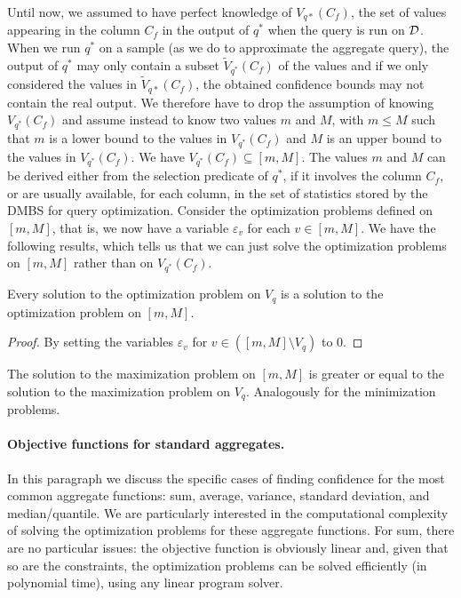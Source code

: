 Until now, we assumed to have perfect knowledge of $V_{q*}(C_f)$, the set of
values appearing in the column $C_f$ in the output of $q^*$ when the query is
run on ${\cal D}$. When we run $q^*$ on a sample (as we do to approximate the
aggregate query), the output of $q^*$ may only contain a subset
$\tilde{V}_{q^*}(C_f)$ of the values and if we only considered the values in
$\tilde{V}_{q*}(C_f)$, the obtained confidence bounds may not contain the real
output. We therefore have to drop the assumption of knowing $V_{q^*}(C_f)$ and
assume instead to know two values $m$ and $M$, with $m\le M$ such that $m$ is a
lower bound to the values in $V_{q^*}(C_f)$ and $M$ is an upper bound to the
values in $V_{q^*}(C_f)$. We have $V_{q^*}(C_f)\subseteq[m,M]$. The values $m$
and $M$ can be derived either from the selection predicate of $q^*$, if it
involves the column $C_f$, or are usually available, for each column, in the set
of statistics stored by the DMBS for query optimization. Consider the optimization
problems defined on $[m,M]$, that is, we now have a variable $\varepsilon_v$ for
each $v\in[m,M]$. 
We have the following results, which tells us that we can just solve
the optimization problems on $[m,M]$ rather than on $V_{q^*}(C_f)$. 

\begin{lemma}\label{lem:equivoptprobs}
  Every solution to the optimization problem on $V_q$ is a solution to the
  optimization problem on $[m,M]$.
\end{lemma}
\begin{proof}
  By setting the variables $\varepsilon_{v}$ for $v\in([m,M]\setminus V_q)$ to $0$.
\end{proof}

\begin{corollary}
  The solution to the maximization problem on $[m,M]$ is greater or equal to the
  solution to the maximization problem on $V_q$. Analogously for the
  minimization problems.
\end{corollary}

\paragraph{Objective functions for standard aggregates.}
In this paragraph we
discuss the specific cases of finding confidence for the most common aggregate
functions: sum, average, variance, standard deviation, and median/quantile. We
are particularly interested in the computational complexity of solving the
optimization problems for these aggregate functions.
For sum, there are no particular issues: the objective function is obviously
linear and, given that so are the constraints, the optimization problems can be
solved efficiently (in polynomial time), using any linear program
solver\citemissing.


